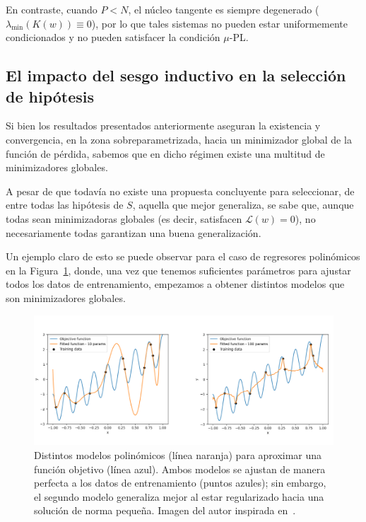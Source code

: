 En contraste, cuando $P < N$, el núcleo tangente es siempre degenerado ($\lambda_{\min}(K(w)) \equiv 0$), por lo que tales sistemas no pueden estar uniformemente condicionados y no pueden satisfacer la condición $\mu$-PL.\newline

\subsection{El impacto del sesgo inductivo en la selección de hipótesis}\label{subsec:suavidad-funcional}

Si bien los resultados presentados anteriormente aseguran la existencia y convergencia, en la zona sobreparametrizada, hacia un minimizador global de la función de pérdida, sabemos que en dicho régimen existe una multitud de minimizadores globales.\newline  

A pesar de que todavía no existe una propuesta concluyente para seleccionar, de entre todas las hipótesis de $S$, aquella que mejor generaliza, se sabe que, aunque todas sean minimizadoras globales (es decir, satisfacen $\mathcal{L}(w) = 0$), no necesariamente todas garantizan una buena generalización.\newline

Un ejemplo claro de esto se puede observar para el caso de regresores polinómicos en la Figura~\ref{fig:suavidad1}, donde, una vez que tenemos suficientes parámetros para ajustar todos los datos de entrenamiento, empezamos a obtener distintos modelos que son minimizadores globales.\newline

\begin{figure}[h]
    \centering
    \includegraphics[width=0.8\linewidth]{img/suavidad1.png}
    \caption[Distintos modelos polinómicos para aproximar una función.]{Distintos modelos polinómicos (línea naranja) para aproximar una función objetivo (línea azul). Ambos modelos se ajustan de manera perfecta a los datos de entrenamiento (puntos azules); sin embargo, el segundo modelo generaliza mejor al estar regularizado hacia una solución de norma pequeña. Imagen del autor inspirada en~\cite{Schaeffer2023}.}\label{fig:suavidad1}
\end{figure}

